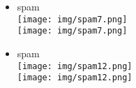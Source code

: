 \documentclass{article}
\theoremstyle{definition}
\theoremstyle{remark}
\begin{document}
\begin{landscape}
\newpage

\begin{itemize}
    \item spam\\\texttt{[image: img/spam7.png]}\\
        \texttt{[image: img/spam7.png]}
    \item spam\\\texttt{[image: img/spam12.png]}\\
        \texttt{[image: img/spam12.png]}
\end{itemize}

\end{landscape}
\end{document}
